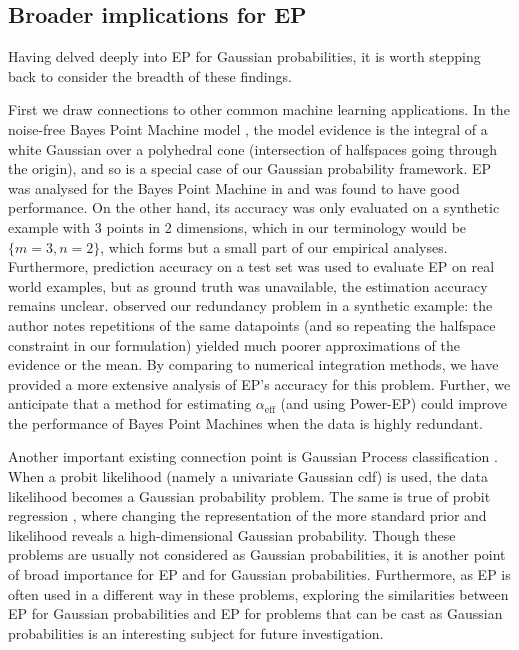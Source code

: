 \documentclass[twoside,11pt]{article}
\begin{document}
\subsection{Broader implications for EP}


Having delved deeply into EP for Gaussian probabilities, it is worth stepping back to consider the breadth of these findings.

First we draw connections to other common machine learning applications.  In the noise-free Bayes Point Machine model \cite[]{herbrichBook, minkaUAI01}, the model evidence is the integral of a white Gaussian over a polyhedral cone (intersection of halfspaces going through the origin), and so is a special case of our Gaussian probability framework.  EP was analysed for the Bayes Point Machine in \cite{minka01phd,minkaUAI01} and was found to have good performance.  On the other hand, its accuracy was only evaluated on a synthetic example with 3 points in 2 dimensions, which in our terminology would be $\{m=3 , n=2\}$, which forms but a small part of our empirical analyses.   Furthermore, prediction accuracy on a test set was used to evaluate EP on real world examples, but as ground truth was unavailable, the estimation accuracy remains unclear.  \cite{minka01phd} observed our redundancy problem in a synthetic example: the author notes repetitions of the same datapoints (and so repeating the halfspace constraint in our formulation) yielded much poorer approximations of the evidence or the mean.   By comparing to numerical integration methods, we have provided a more extensive analysis of EP's accuracy for this problem.  Further, we anticipate that a method for estimating $\alpha_{\text{eff}}$ (and using Power-EP) could improve the performance of Bayes Point Machines when the data is highly redundant.

Another important existing connection point is Gaussian Process classification \cite[]{rasmussenBook, KussRasmussen2005}.  When a probit likelihood (namely a univariate Gaussian cdf) is used, the data likelihood becomes a Gaussian probability problem.   The same is true of probit regression \cite[]{ochi1984}, where changing the representation of the more standard prior and likelihood reveals a high-dimensional Gaussian probability.  Though these problems are usually not considered as Gaussian probabilities, it is another point of broad importance for EP and for Gaussian probabilities.  Furthermore, as EP is often used in a different way in these problems, exploring the similarities between EP for Gaussian probabilities and EP for problems that can be cast as Gaussian probabilities is an interesting subject for future investigation.
\end{document}
